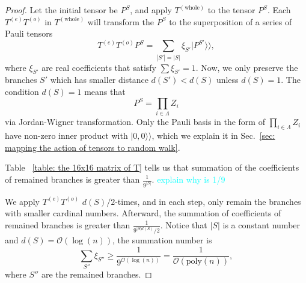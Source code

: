 \documentclass{article}
\newcommand{\Twhole}{T^{(\text{whole})}}
\newcommand{\supket}[1]{|#1 \rangle\rangle}
\begin{document}
\begin{proof}
    Let the initial tensor be $P^S$, and apply $\Twhole$ to the tensor $P^S$. Each $T^{(e)}T^{(o)}$ in $\Twhole$ will transform the $P^S$ to the superposition of a series of Pauli tensors
    \begin{equation}
        T^{(e)}T^{(o)} P^S = \sum_{|S'| = |S|} \xi_{S'} \supket{P^{S'}},
    \end{equation}
    where $\xi_{S'}$ are real coefficients that satisfy $\sum \xi_{S'} = 1$. Now, we only preserve the branches $S'$ which has smaller distance $d(S') < d(S)$ unless $d(S) = 1$. The condition $d(S) = 1$ means that 
    \begin{equation}
    P^S = \prod_{i\in \Lambda} Z_i    
    \end{equation}
    via Jordan-Wigner transformation. Only the Pauli basis in the form of $\prod_{i\in \Lambda} Z_i$ have non-zero inner product with $\supket{0,0}$, which we explain it in Sec.~\ref{sec: mapping the action of tensors to random walk}.

    Table ~\ref{table: the 16x16 matrix of T} tells us that summation of the coefficients of remained branches is greater than $\frac{1}{9^{|S|}}$. \textcolor{cyan}{explain why is 1/9} 

    We apply $T^{(e)}T^{(o)}$ $d(S)/2$-times, and in each step, only remain the branches with smaller cardinal numbers. Afterward, the summation of coefficients of remained branches is greater than $\frac{1}{9^{|S| d(S)}/2}$. Notice that $|S|$ is a constant number and $d(S) = \mathcal{O}(\log(n))$, the summation number is 
    \begin{equation}
        \sum_{S''} \xi_{S''} \geq  \frac{1}{9^{\mathcal{O}(\log(n))}} = \frac{1}{\mathcal{O}(\mathrm{poly}(n))},
    \end{equation}
    where $S''$ are the remained branches.
\end{proof}



\end{document}
